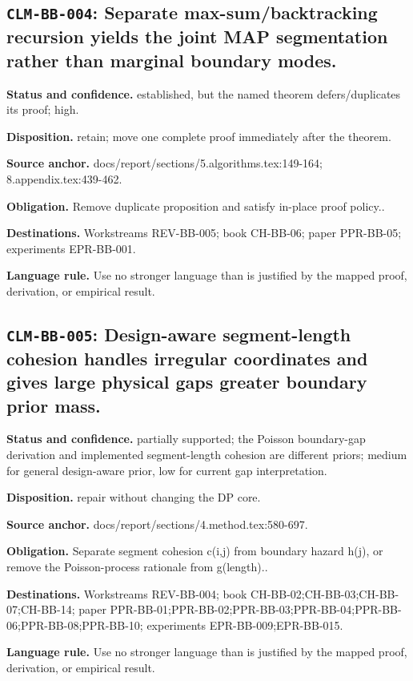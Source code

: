 \subsection[\texttt{CLM-BB-004}]{\texttt{CLM-BB-004}: Separate max-sum/backtracking recursion yields the joint MAP segmentation rather than marginal boundary modes.}
\textbf{Status and confidence.} established, but the named theorem defers/duplicates its proof; high.\par
\textbf{Disposition.} retain; move one complete proof immediately after the theorem.\par
\textbf{Source anchor.} docs/report/sections/5.algorithms.tex:149-164; 8.appendix.tex:439-462.\par
\textbf{Obligation.} Remove duplicate proposition and satisfy in-place proof policy..\par
\textbf{Destinations.} Workstreams REV-BB-005; book CH-BB-06; paper PPR-BB-05; experiments EPR-BB-001.\par
\textbf{Language rule.} Use no stronger language than is justified by the mapped proof, derivation, or empirical result.

\subsection[\texttt{CLM-BB-005}]{\texttt{CLM-BB-005}: Design-aware segment-length cohesion handles irregular coordinates and gives large physical gaps greater boundary prior mass.}
\textbf{Status and confidence.} partially supported; the Poisson boundary-gap derivation and implemented segment-length cohesion are different priors; medium for general design-aware prior, low for current gap interpretation.\par
\textbf{Disposition.} repair without changing the DP core.\par
\textbf{Source anchor.} docs/report/sections/4.method.tex:580-697.\par
\textbf{Obligation.} Separate segment cohesion c(i,j) from boundary hazard h(j), or remove the Poisson-process rationale from g(length)..\par
\textbf{Destinations.} Workstreams REV-BB-004; book CH-BB-02;CH-BB-03;CH-BB-07;CH-BB-14; paper PPR-BB-01;PPR-BB-02;PPR-BB-03;PPR-BB-04;PPR-BB-06;PPR-BB-08;PPR-BB-10; experiments EPR-BB-009;EPR-BB-015.\par
\textbf{Language rule.} Use no stronger language than is justified by the mapped proof, derivation, or empirical result.

